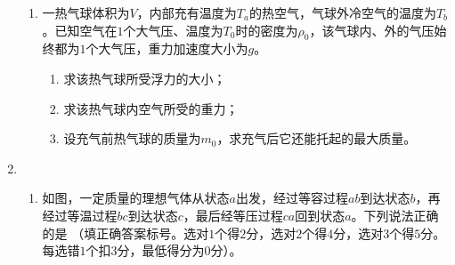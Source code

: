 \begin{enumerate}[leftmargin=0em]
\begin{enumerate}
\item 
一热气球体积为$ V $，内部充有温度为$ T_a $的热空气，气球外冷空气的温度为$ T_b $。已知空气在$ 1 $个大气压、温度为$ T_{0} $时的密度为$ \rho _0 $，该气球内、外的气压始终都为$ 1 $个大气压，重力加速度大小为$ g $。
\begin{enumerate}
\renewcommand{\labelenumi}{\arabic{enumi}.}
\item
求该热气球所受浮力的大小；
\item 
求该热气球内空气所受的重力；
\item 
设充气前热气球的质量为$ m_{0} $，求充气后它还能托起的最大质量。



\end{enumerate}





\end{enumerate}



\newpage
\item 
{}
\begin{enumerate}
\renewcommand{\labelenumi}{\arabic{enumi}.}
\item
如图，一定质量的理想气体从状态$ a $出发，经过等容过程$ ab $到达状态$ b $，再经过等温过程$ bc $到达状态$ c $，最后经等压过程$ ca $回到状态$ a $。下列说法正确的是  
（填正确答案标号。选对$ 1 $个得$ 2 $分，选对$ 2 $个得$ 4 $分，选对$ 3 $个得$ 5 $分。每选错$ 1 $个扣$ 3 $分，最低得分为$ 0 $分）。
\begin{figure}[h!]
\centering

\end{figure}


\end{enumerate}
\end{enumerate}
